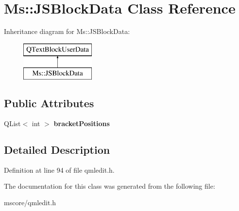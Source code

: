 \hypertarget{class_ms_1_1_j_s_block_data}{}\section{Ms\+:\+:J\+S\+Block\+Data Class Reference}
\label{class_ms_1_1_j_s_block_data}
Inheritance diagram for Ms\+:\+:J\+S\+Block\+Data\+:\begin{figure}[H]
\begin{center}
\leavevmode
\includegraphics[height=2.000000cm]{class_ms_1_1_j_s_block_data}
\end{center}
\end{figure}
\subsection*{Public Attributes}
\begin{DoxyCompactItemize}
\item 
\mbox{\label{class_ms_1_1_j_s_block_data_ad083a98e53ccd4ceac51ea141ea6f23a}} 
Q\+List$<$ int $>$ {\bfseries bracket\+Positions}
\end{DoxyCompactItemize}


\subsection{Detailed Description}


Definition at line 94 of file qmledit.\+h.



The documentation for this class was generated from the following file\+:\begin{DoxyCompactItemize}
\item 
mscore/qmledit.\+h\end{DoxyCompactItemize}
